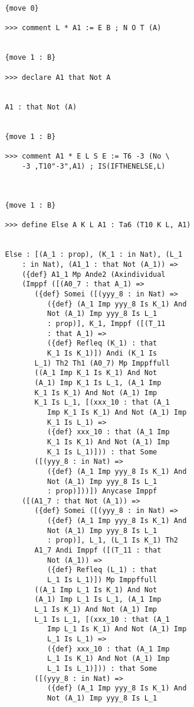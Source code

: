 \documentclass{article}
\begin{document}
\begin{verbatim}
   {move 0}

   >>> comment L * A1 := E B ; N O T (A)


   {move 1 : B}

   >>> declare A1 that Not A


   A1 : that Not (A)


   {move 1 : B}

   >>> comment A1 * E L S E := T6 -3 (No \
       -3 ,T10"-3",A1) ; IS(IFTHENELSE,L)



   {move 1 : B}

   >>> define Else A K L A1 : Ta6 (T10 K L, A1)


   Else : [(A_1 : prop), (K_1 : in Nat), (L_1 
       : in Nat), (A1_1 : that Not (A_1)) => 
       ({def} A1_1 Mp Ande2 (Axindividual 
       (Imppf ([(A0_7 : that A_1) => 
          ({def} Somei ([(yyy_8 : in Nat) => 
             ({def} (A_1 Imp yyy_8 Is K_1) And 
             Not (A_1) Imp yyy_8 Is L_1 
             : prop)], K_1, Imppf ([(T_11 
             : that A_1) => 
             ({def} Refleq (K_1) : that 
             K_1 Is K_1)]) Andi (K_1 Is 
          L_1) Th2 Th1 (A0_7) Mp Imppffull 
          ((A_1 Imp K_1 Is K_1) And Not 
          (A_1) Imp K_1 Is L_1, (A_1 Imp 
          K_1 Is K_1) And Not (A_1) Imp 
          K_1 Is L_1, [(xxx_10 : that (A_1 
             Imp K_1 Is K_1) And Not (A_1) Imp 
             K_1 Is L_1) => 
             ({def} xxx_10 : that (A_1 Imp 
             K_1 Is K_1) And Not (A_1) Imp 
             K_1 Is L_1)])) : that Some 
          ([(yyy_8 : in Nat) => 
             ({def} (A_1 Imp yyy_8 Is K_1) And 
             Not (A_1) Imp yyy_8 Is L_1 
             : prop)]))]) Anycase Imppf 
       ([(A1_7 : that Not (A_1)) => 
          ({def} Somei ([(yyy_8 : in Nat) => 
             ({def} (A_1 Imp yyy_8 Is K_1) And 
             Not (A_1) Imp yyy_8 Is L_1 
             : prop)], L_1, (L_1 Is K_1) Th2 
          A1_7 Andi Imppf ([(T_11 : that 
             Not (A_1)) => 
             ({def} Refleq (L_1) : that 
             L_1 Is L_1)]) Mp Imppffull 
          ((A_1 Imp L_1 Is K_1) And Not 
          (A_1) Imp L_1 Is L_1, (A_1 Imp 
          L_1 Is K_1) And Not (A_1) Imp 
          L_1 Is L_1, [(xxx_10 : that (A_1 
             Imp L_1 Is K_1) And Not (A_1) Imp 
             L_1 Is L_1) => 
             ({def} xxx_10 : that (A_1 Imp 
             L_1 Is K_1) And Not (A_1) Imp 
             L_1 Is L_1)])) : that Some 
          ([(yyy_8 : in Nat) => 
             ({def} (A_1 Imp yyy_8 Is K_1) And 
             Not (A_1) Imp yyy_8 Is L_1 

\end{verbatim}
\end{document}
